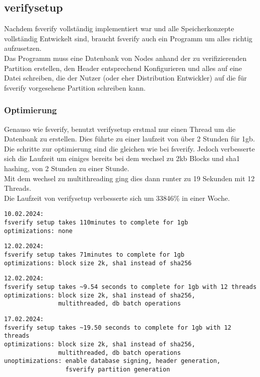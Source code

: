 \subsection{verifysetup}
Nachdem fsverify vollständig implementiert war und alle Speicherkonzepte vollständig Entwickelt sind, braucht fsverify auch ein Programm um alles richtig aufzusetzen.\\
Das Programm muss eine Datenbank von Nodes anhand der zu verifizierenden Partition erstellen, den Header entsprechend Konfigurieren und alles auf eine Datei schreiben, die der Nutzer (oder eher Distribution Entwickler) auf die für fsverify vorgesehene Partition schreiben kann.

\subsubsection{Optimierung}
Genauso wie fsverify, benutzt verifysetup erstmal nur einen Thread um die Datenbank zu erstellen. Dies führte zu einer laufzeit von über 2 Stunden für 1gb.\\
Die schritte zur optimierung sind die gleichen wie bei fsverify. Jedoch verbesserte sich die Laufzeit um einiges bereits bei dem wechsel zu 2kb Blocks und sha1 hashing, von 2 Stunden zu einer Stunde.\\
Mit dem wechsel zu multithreading ging dies dann runter zu 19 Sekunden mit 12 Threads.
\\
Die Laufzeit von verifysetup verbesserte sich um 33846\% in einer Woche.
\begin{verbatim}
10.02.2024:
fsverify setup takes 110minutes to complete for 1gb
optimizations: none
\end{verbatim}
\begin{verbatim}
12.02.2024:
fsverify setup takes 71minutes to complete for 1gb
optimizations: block size 2k, sha1 instead of sha256
\end{verbatim}
\begin{verbatim}
12.02.2024:
fsverify setup takes ~9.54 seconds to complete for 1gb with 12 threads
optimizations: block size 2k, sha1 instead of sha256,
               multithreaded, db batch operations
\end{verbatim}
\begin{verbatim}
17.02.2024:
fsverify setup takes ~19.50 seconds to complete for 1gb with 12 threads
optimizations: block size 2k, sha1 instead of sha256,
               multithreaded, db batch operations
unoptimizations: enable database signing, header generation,
                 fsverify partition generation
\end{verbatim}


